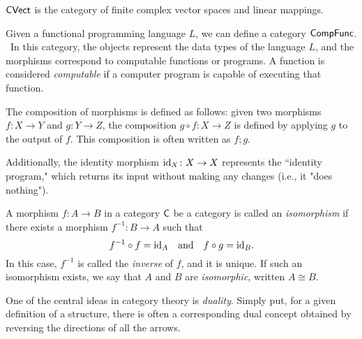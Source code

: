 \begin{example}
 $\mathsf{CVect}$ is the category of finite complex vector spaces and linear mappings.
\end{example}

\begin{example}
Given a functional programming language $L$, we can define a category $\mathsf{CompFunc}$.  In this category, the objects represent the data types of the language \( L \), and the morphisms correspond to computable functions or programs. A function is considered \emph{computable} if a computer program is capable of executing that function.

The composition of morphisms is defined as follows: given two morphisms \( f \colon X \to Y \) and \( g \colon Y \to Z \), the composition \( g \circ f \colon X \to Z \) is defined by applying \( g \) to the output of \( f \). This composition is often written as \( f;g \).

Additionally, the identity morphism \( \mathrm{id}_X \colon X \to X \) represents the ``identity program," which returns its input without making any changes (i.e., it "does nothing").
\end{example}


\begin{definition} 
 A morphism $f : A \to B$  in a category $\mathsf{C}$ be a category is called an \emph{isomorphism} if there exists a morphism $f^{-1} : B \to A$ such that
\[
f^{-1} \circ f = \mathrm{id}_A \quad \text{and} \quad f \circ g = \mathrm{id}_B.
\]
In this case, $f^{-1}$ is called the \emph{inverse} of $f$, and it is unique. If such an isomorphism exists, we say that $A$ and $B$ are \emph{isomorphic}, written
$A \cong B.$
\end{definition}

One of the central ideas in category theory is \emph{duality}. Simply put, for a given definition of a structure, there is often a corresponding dual concept obtained by reversing the directions of all the arrows. 

